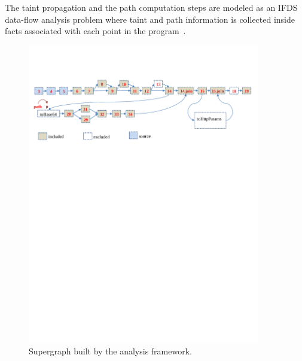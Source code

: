 The taint propagation and the path computation steps are modeled as an IFDS data-flow analysis problem where taint and path information is collected inside facts associated with each point in the program~\cite{heros,Bodden:2012:IDA:2259051.2259052}. 
\setlength{\belowcaptionskip}{-10pt}
\begin{figure}[t]
  \centering
    \includegraphics[width=4in]{./images/supergraph.pdf}
  \caption{Supergraph built by the analysis framework. \label{fig:supergraph}}
 \end{figure}

